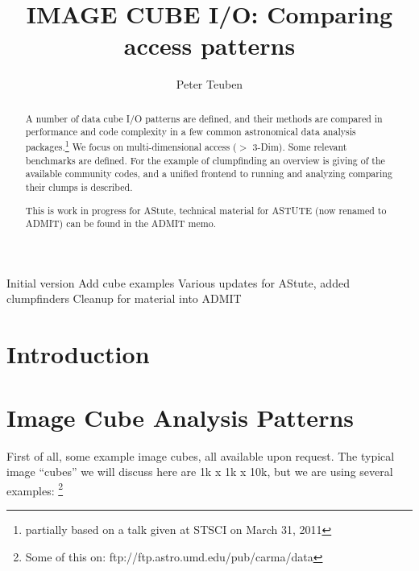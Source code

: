 \documentclass[preprint]{aastex} %
\begin{document}

\title{IMAGE CUBE I/O: Comparing access patterns}

\author{Peter Teuben}

\begin{abstract}

A number of data cube I/O patterns are defined, and
their methods are compared in performance
and code complexity in a few common astronomical
data analysis packages.\footnote{partially based on a talk
given at STSCI on March 31, 2011} 
We focus on multi-dimensional access ($>$ 3-Dim). 
Some relevant benchmarks are defined. 
For the example of clumpfinding an overview is giving
of the available community codes, and a unified frontend
to running and analyzing comparing their clumps is 
described.

This is work in progress for AStute, technical material for ASTUTE
(now renamed to ADMIT) can be found in the ADMIT memo.
\end{abstract}


\ChangeRecordBegin
{}
{Initial version }
{Add cube examples }
{Various updates for AStute, added clumpfinders}
{Cleanup for material into ADMIT}
\ChangeRecordEnd


\section{Introduction}

\section{Image Cube Analysis Patterns}


First of all, some 
example image cubes, all available upon request.
The typical image ``cubes'' we will discuss here are 1k x 1k x 10k, but we 
are using several examples:
\footnote{Some of this on: ftp://ftp.astro.umd.edu/pub/carma/data}
\end{document}
